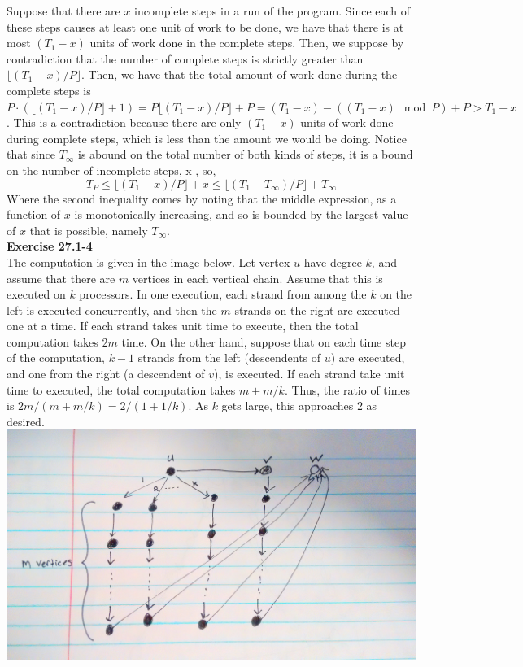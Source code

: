 \documentclass{article}
\begin{document}
Suppose that there are $x$ incomplete steps in a run of the program. Since each of these steps causes at least one unit of work to be done, we have that there is at most $(T_1-x)$ units of work done in the complete steps. Then, we suppose by contradiction that the number of complete steps is strictly greater than $\lfloor (T_1-x)/P\rfloor$. Then, we have that the total amount of work done during the complete steps is $P\cdot (\lfloor (T_1-x)/P\rfloor + 1) = P\lfloor (T_1-x)/P\rfloor +P =  (T_1-x) - ((T_1-x)\mod P) + P > T_1-x$. This is a contradiction because there are only $(T_1-x)$ units of work done during complete steps, which is less than the amount we would be doing. Notice that since $T_\infty$ is abound on the total number of both kinds of steps, it is a bound on the number of incomplete steps, x , so, 
\[
T_P \le \lfloor (T_1-x)/P\rfloor +x \le \lfloor (T_1-T_{\infty})/P\rfloor +T_{\infty} 
\]
Where the second inequality comes by noting that the middle expression, as a function of $x$ is monotonically increasing, and so is bounded by the largest value of $x$ that is possible, namely $T_{\infty}$.\\

\noindent\textbf{Exercise 27.1-4}\\

The computation is given in the image below.  Let vertex $u$ have degree $k$, and assume that there are $m$ vertices in each vertical chain.  Assume that this is executed on $k$ processors.  In one execution, each strand from among the $k$ on the left is executed concurrently, and then the $m$ strands on the right are executed one at a time.  If each strand takes unit time to execute, then the total computation takes $2m$ time.  On the other hand, suppose that on each time step of the computation, $k-1$ strands from the left (descendents of $u$) are executed, and one from the right (a descendent of $v$), is executed.  If each strand take unit time to executed, the total computation takes $m + m/k$.  Thus, the ratio of times is $2m/(m + m/k) = 2/(1+1/k)$.  As $k$ gets large, this approaches 2 as desired.  \\

\includegraphics[scale=.1]{2CompDag.jpg}\\
\end{document}
